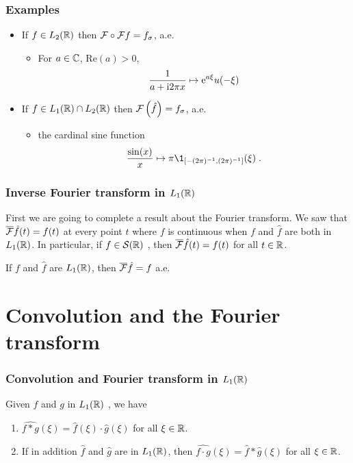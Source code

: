 \begin{frame}
\frametitle{Examples}
\begin{itemize}
\item If $f \in L_2(\mathbb{R})$ then $\mathcal{F} \circ \mathcal{F} f= f_\sigma$, a.e.
\begin{itemize}
\item  For $a \in \mathbb{C}$, $\mathrm{Re}(a) > 0$,
\[
\frac{1}{a+ \mathrm{i} 2 \pi x} \mapsto \mathrm{e}^{a \xi} u(-\xi)
\]
\end{itemize}
\item If $f \in L_1(\mathbb{R}) \cap L_2(\mathbb{R})$ then $\mathcal{F}\left( \hat{f} \right)= f_\sigma$, a.e.
\begin{itemize}
\item  the cardinal sine function
\[
\frac{\sin(x)}{x} \mapsto \pi \1_{\ccint{-(2\pi)^{-1},(2\pi)^{-1}}}(\xi) \eqsp.
\]
\end{itemize}
\end{itemize}
\end{frame}

\begin{frame}
\frametitle{Inverse Fourier transform in $L_1(\mathbb{R})$}
First we are going to complete a result about the Fourier transform. We saw  that $\overline{\mathcal{F}} \hat{f}(t)=f(t)$ at every point $t$ where $f$ is continuous when $f$ and $\hat{f}$  are both in $L_1(\mathbb{R})$. In particular, if $ f\in \mathcal{S}(\mathbb{R})$ , then $\overline{\mathcal{F}} \hat{f}(t)=f(t)$ for all $ t\in \mathbb{R}$.

\begin{theorem}
If $f$ and $\hat{f}$ are $L_1(\mathbb{R})$, then $\overline{\mathcal{F}} \hat{f}=f$ a.e.
\end{theorem}
\end{frame}

\section{Convolution and the Fourier transform}
\begin{frame}
\frametitle{Convolution and Fourier transform in $L_1(\mathbb{R})$}
\begin{theorem}
Given $f$ and $g$ in $L_1(\mathbb{R})$ , we have
\begin{enumerate}[label=(\roman*)]
\item $\widehat{f*g}(\xi)=\hat{f}(\xi)\cdot\hat{g}(\xi)$  for all $\xi \in \mathbb{R}$.
\item If in addition $\hat{f}$ and $\hat{g}$ are in $L_1(\mathbb{R})$, then
$\widehat{f\cdot g}(\xi)=\hat{f}*\hat{g}(\xi)$ for all $\xi\in \mathbb{R}$.
\end{enumerate}
\end{theorem}

\end{frame}

